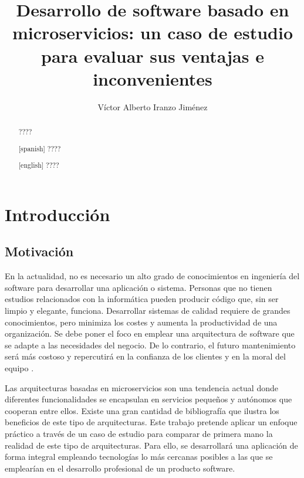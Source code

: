 \documentclass[11pt,spanish,listoffigures]{tfgetsinf}
\title{ Desarrollo de software basado en microservicios: un caso de estudio para evaluar sus ventajas e inconvenientes }
\author{Víctor Alberto Iranzo Jiménez}
\begin{document}

\begin{abstract}
????
\end{abstract}
\begin{abstract}[spanish]
????
\end{abstract}
\begin{abstract}[english]
????
\end{abstract}


\mainmatter


\chapter{Introducci\'on}

\section{Motivaci\'on}

En la actualidad, no es necesario un alto grado de conocimientos en ingeniería del software para desarrollar una aplicación o sistema. Personas que no tienen estudios relacionados con la informática pueden producir código que, sin ser limpio y elegante, funciona. Desarrollar sistemas de calidad requiere de grandes conocimientos, pero minimiza los costes y aumenta la productividad de una organización. Se debe poner el foco en emplear una arquitectura de software que se adapte a las necesidades del negocio. De lo contrario, el futuro mantenimiento será más costoso y repercutirá en la confianza de los clientes y en la moral del equipo \cite{Martin2017}.

Las arquitecturas basadas en microservicios son una tendencia actual donde diferentes funcionalidades se encapsulan en servicios pequeños y autónomos que cooperan entre ellos. Existe una gran cantidad de bibliografía que ilustra los beneficios de este tipo de arquitecturas. Este trabajo pretende aplicar un enfoque práctico a través de un caso de estudio para comparar de primera mano la realidad de este tipo de arquitecturas. Para ello, se desarrollará una aplicación de forma integral empleando tecnologías lo más cercanas posibles a las que se emplearían en el desarrollo profesional de un producto software.
\end{document}
